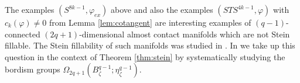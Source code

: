 \documentclass[12pt]{amsart}
\newcommand\Z{\mathbb{Z}}
\newcommand\acs{\varphi}  				%
\newcommand\scxs{\zeta}					%
\newtheorem{Proposition}[Theorem]{Proposition}
\theoremstyle{remark}
\newcommand{\jbcomm}[1]{\begingroup\color{green}JB:~#1\endgroup}
\newcommand{\ascomm}[1]{\begingroup\color{red}AS:~#1\endgroup}
\begin{document}
The examples $(S^{8k{-}1}, \acs_{ex})$ above and also the examples $(STS^{4k{-}1}, \acs)$ 
with $c_k(\varphi) \neq 0$ from Lemma \ref{lem:cotangent} are interesting examples of $(q{-}1)$-connected
$(2q{+}1)$-dimensional almost contact manifolds which are not Stein fillable.
The Stein fillability of such manifolds was studied in \cite{Geiges93, Geiges97}.
In \cite{BCS3} we take up this question in the context of Theorem \ref{thm:stein} 
by systematically studying the bordism groups $\Omega_{2q{+}1}(B^{q{-}1}_\scxs; \eta^{q{-}1}_\scxs)$.

\begin{comment}
\jbcomm{Should the remainder of this section be removed or not?} 
\ascomm{I think we can skip the rest of the section. It was designed to show that 
if $S^1\times S^{8k{-}2}$ with some appropriate almost contact str is contact, then so is
$\zeta _{ex}$. Now we know both. Now we have a relative fillability, which might be left out, I 
think.}

Let $\zeta_{ex}$ be a stable complex structure on $S^1 \times S^{8k{-}2}$
such that $c_{4k{-}1}(\zeta_{ex}) = (4k{-}2)! \cdot u$ where $u$ is a generator of
$H^{8k{-}2}(S^1 \times S^{8k{-}2}; \Z)$.

\begin{Proposition} \label{prop:surgery}
If $(S^1 \times S^{8k{-}2}, \zeta_{ex})$ is fillable, then so is $(S^{8k{-}1}, \zeta_{ex})$.
\end{Proposition}

\begin{proof}
Do surgery on $S^1$ and prove that for one of the framings, you get $(S^{15}, \scxs_{ex})$.
Uses the homotopy type of $SO/U$ and the fact that multiplication by $\eta$,
$\eta \colon \pi_{8k{-}2}(SO/U) \to \pi_{8k{-}1}(SO/U)$ is non{-}zero.

Let $\eta_{14} \colon  S^{15} \to S^{14}$ be essential.  Then composition with
$\eta_{14}$ gives the
non{-}trivial homomorphism
\[
\eta_{14}* \colon  \pi_{14}(SO/U) \to \pi_{15}(SO/U) = {\mathbb {Z}}/2{\mathbb {Z}}.
\]
When you look at the $\xi$ you can hopefully construct on $S^1 \times  S^14$, then,
relative
to the Stein fillable $\xi$ on $S^1 \times  S^{14}$ it gives an element of 
\[
[S^1 \times  S^{14}, SO/U] \cong \pi_{14}(SO/U) \oplus \pi_{15}(SO/U).
\]
If you have $c_7(\xi) = 6!$ times a generator, this corresponds to a generator of
the factor
$\pi_{14}(SO/U) \cong \pi_14(U)$.  In the above coorindates, if you start with a
stable 
complex structure on $(x, y)$ on $S^1 \times S^{14}$, then after surgery, I think you
will end up with either
$Z_F = y$   or   $Z_F = \eta_{14}* x + y $
on $S^{15}$, depending on how you frame $S^1 \times  D^{14} \subset S^1 \times S^{14}$.  So,
if $x$ is a
generator of $\pi_{14}(SO/U)$, you can choose a framing $F$ for surgery, such that
$z_F$ is exotic.



\end{comment}
\end{document}
